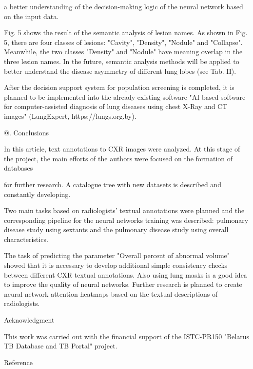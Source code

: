 \documentclass[a4paper]{article}
\makeatletter
\newcommand*{\rom}[1]{\expandafter\@slowromancap\romannumeral #1@}
\makeatother
\begin{document}
\begin{multicols}{2}
a better understanding of the decision-making logic of
the neural network based on the input data.\par
Fig. 5 shows the result of the semantic analysis of
lesion names. As shown in Fig. 5, there are four classes
of lesions: "Cavity", "Density", "Nodule" and "Collapse".
Meanwhile, the two classes "Density" and "Nodule" have
meaning overlap in the three lesion names. In the future,
semantic analysis methods will be applied to better
understand the disease asymmetry of different lung lobes
(see Tab. II).\par
After the decision support system for population
screening is completed, it is planned to be implemented into the already existing software "AI-based
software for computer-assisted diagnosis of lung diseases using chest X-Ray and CT images" (LungExpert,
https://lungs.org.by).\\

\centerline{\rom {8}. Conclusions}
\vspace{3 mm}
In this article, text annotations to CXR images were
analyzed. At this stage of the project, the main efforts of
the authors were focused on the formation of databases

for further research. A catalogue tree with new datasets
is described and constantly developing.\par
Two main tasks based on radiologists’ textual annotations were planned and the corresponding pipeline for the neural networks training was described: pulmonary disease study using sextants and the pulmonary disease
study using overall characteristics.\par
The task of predicting the parameter "Overall percent
of abnormal volume" showed that it is necessary to
develop additional simple consistency checks between
different CXR textual annotations. Also using lung masks
is a good idea to improve the quality of neural networks.
Further research is planned to create neural network
attention heatmaps based on the textual descriptions of
radiologists.\\
\par
\centerline{Acknowledgment}
\vspace{2 mm}
This work was carried out with the financial support of
the ISTC-PR150 "Belarus TB Database and TB Portal"
project.\\
\par

\centerline{Reference}


\end{multicols}
\end{document}
